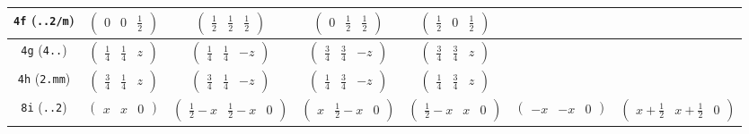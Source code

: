 \documentclass[fleqn,9pt,landscape]{jsarticle}
\begin{document}
\begin{center}
\begin{longtable}{ccccccc}
{\tt 4f} ({\tt ..2/m}) & $ \begin{pmatrix} 0 & 0 & \frac{1}{2} \end{pmatrix} $ & $ \begin{pmatrix} \frac{1}{2} & \frac{1}{2} & \frac{1}{2} \end{pmatrix} $ & $ \begin{pmatrix} 0 & \frac{1}{2} & \frac{1}{2} \end{pmatrix} $ & $ \begin{pmatrix} \frac{1}{2} & 0 & \frac{1}{2} \end{pmatrix} $ & $  $ & $  $ \\ \hline
{\tt 4g} ({\tt 4..}) & $ \begin{pmatrix} \frac{1}{4} & \frac{1}{4} & z \end{pmatrix} $ & $ \begin{pmatrix} \frac{1}{4} & \frac{1}{4} & - z \end{pmatrix} $ & $ \begin{pmatrix} \frac{3}{4} & \frac{3}{4} & - z \end{pmatrix} $ & $ \begin{pmatrix} \frac{3}{4} & \frac{3}{4} & z \end{pmatrix} $ & $  $ & $  $ \\ \hline
{\tt 4h} ({\tt 2.mm}) & $ \begin{pmatrix} \frac{3}{4} & \frac{1}{4} & z \end{pmatrix} $ & $ \begin{pmatrix} \frac{3}{4} & \frac{1}{4} & - z \end{pmatrix} $ & $ \begin{pmatrix} \frac{1}{4} & \frac{3}{4} & - z \end{pmatrix} $ & $ \begin{pmatrix} \frac{1}{4} & \frac{3}{4} & z \end{pmatrix} $ & $  $ & $  $ \\ \hline
{\tt 8i} ({\tt ..2}) & $ \begin{pmatrix} x & x & 0 \end{pmatrix} $ & $ \begin{pmatrix} \frac{1}{2} - x & \frac{1}{2} - x & 0 \end{pmatrix} $ & $ \begin{pmatrix} x & \frac{1}{2} - x & 0 \end{pmatrix} $ & $ \begin{pmatrix} \frac{1}{2} - x & x & 0 \end{pmatrix} $ & $ \begin{pmatrix} - x & - x & 0 \end{pmatrix} $ & $ \begin{pmatrix} x + \frac{1}{2} & x + \frac{1}{2} & 0 \end{pmatrix} $ \\

\end{longtable}
\end{center}
\end{document}
